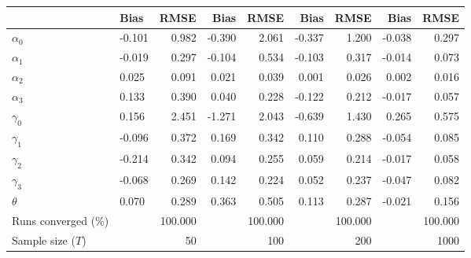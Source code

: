 
\begin{tabular}[t]{llrrrrrrr}
\toprule
  & Bias & RMSE & Bias & RMSE & Bias & RMSE & Bias & RMSE\\
\midrule
$\alpha_{0}$ & -0.101 & 0.982 & -0.390 & 2.061 & -0.337 & 1.200 & -0.038 & 0.297\\
$\alpha_{1}$ & -0.019 & 0.297 & -0.104 & 0.534 & -0.103 & 0.317 & -0.014 & 0.073\\
$\alpha_{2}$ & 0.025 & 0.091 & 0.021 & 0.039 & 0.001 & 0.026 & 0.002 & 0.016\\
$\alpha_{3}$ & 0.133 & 0.390 & 0.040 & 0.228 & -0.122 & 0.212 & -0.017 & 0.057\\
$\gamma_{0}$ & 0.156 & 2.451 & -1.271 & 2.043 & -0.639 & 1.430 & 0.265 & 0.575\\
$\gamma_{1}$ & -0.096 & 0.372 & 0.169 & 0.342 & 0.110 & 0.288 & -0.054 & 0.085\\
$\gamma_{2}$ & -0.214 & 0.342 & 0.094 & 0.255 & 0.059 & 0.214 & -0.017 & 0.058\\
$\gamma_{3}$ & -0.068 & 0.269 & 0.142 & 0.224 & 0.052 & 0.237 & -0.047 & 0.082\\
$\theta$ & 0.070 & 0.289 & 0.363 & 0.505 & 0.113 & 0.287 & -0.021 & 0.156\\
Runs converged (\%) &  & 100.000 &  & 100.000 &  & 100.000 &  & 100.000\\
Sample size ($T$) &  & 50 &  & 100 &  & 200 &  & 1000\\
\bottomrule
\end{tabular}
